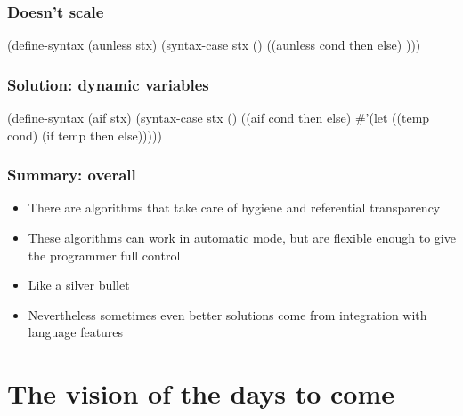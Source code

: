 \documentclass[hyperref={bookmarks=false}]{beamer}
\begin{document}
\begin{frame}[fragile]
\frametitle{Doesn't scale}
\begin{semiverbatim}

(define-syntax (aunless stx)
  (syntax-case stx ()
    ((aunless cond then else)
     )))

\end{semiverbatim}
\end{frame}

\begin{frame}[fragile]
\frametitle{Solution: dynamic variables}
\begin{semiverbatim}


(define-syntax (aif stx)
  (syntax-case stx ()
    ((aif cond then else)
       #'(let ((temp cond)
           (if temp then else)))))
\end{semiverbatim}
\end{frame}

\begin{frame}[fragile]
\frametitle{Summary: overall}
\begin{itemize}
\item There are algorithms that take care of hygiene and referential transparency
\item These algorithms can work in automatic mode, but are flexible enough to give the programmer full control
\item Like a silver bullet
\item Nevertheless sometimes even better solutions come from integration with language features
\end{itemize}
\end{frame}

\section{The vision of the days to come}
\end{document}
